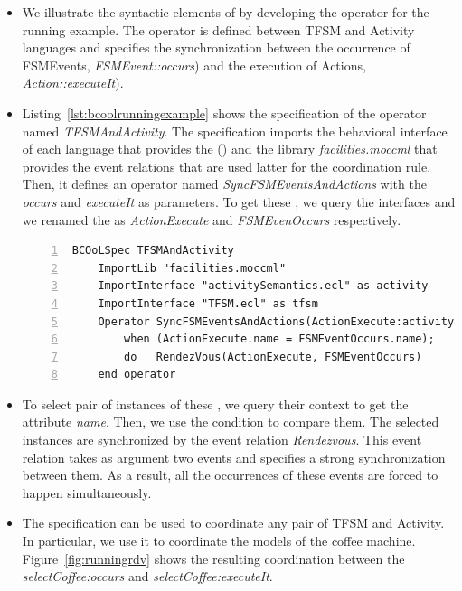 \begin{itemize}
	\item We illustrate the syntactic elements of \bcool by developing the operator for the running example. The operator is defined between TFSM and Activity languages and specifies the synchronization between the occurrence of FSMEvents, \ie \dse \emph{FSMEvent::occurs}) and the execution of Actions, \ie \dse \emph{Action::executeIt}). 
	
	\item Listing~\ref{lst:bcoolrunningexample} shows the \bcool specification of the operator named \emph{TFSMAndActivity}. The specification imports the behavioral interface of each language that provides the \dse () and the \moccml library \emph{facilities.moccml} that provides the event relations that are used latter for the coordination rule. Then, it defines an operator named \emph{SyncFSMEventsAndActions} with the \dse \emph{occurs} and \emph{executeIt} as parameters. To get these \dse, we query the interfaces and we renamed the \dse as \emph{ActionExecute} and \emph{FSMEvenOccurs} respectively. 
	
	
	\begin{lstlisting}[language=bcool,
	caption={Synchronized product operator between the TFSM and Activity languages},
	label={lst:bcoolrunningexample}, 
	basicstyle=\scriptsize\ttfamily, backgroundcolor=\color{LGrey}, numbers=left, xleftmargin=2pt]
	BCOoLSpec TFSMAndActivity
	ImportLib "facilities.moccml"
	ImportInterface "activitySemantics.ecl" as activity
	ImportInterface "TFSM.ecl" as tfsm
	Operator SyncFSMEventsAndActions(ActionExecute:activity::executeIt, FSMEventOccurs:tfsm::occurs)
		when (ActionExecute.name = FSMEventOccurs.name);
		do   RendezVous(ActionExecute, FSMEventOccurs)
	end operator
	\end{lstlisting}
	
	\item To select pair of instances of these \dse, we query their context to get the attribute \emph{name}. Then, we use the condition to compare them. The selected instances are synchronized by the event relation \emph{Rendezvous}. This event relation takes as argument two events and specifies a strong synchronization between them. As a result, all the occurrences of these events are forced to happen simultaneously. 
	
	\item The specification can be used to coordinate any pair of TFSM and Activity. In particular, we use it to coordinate the models of the coffee machine. Figure~\ref{fig:runningrdv} shows the resulting coordination between the \mse \emph{selectCoffee:occurs} and \emph{selectCoffee:executeIt}. 
	

\end{itemize}
